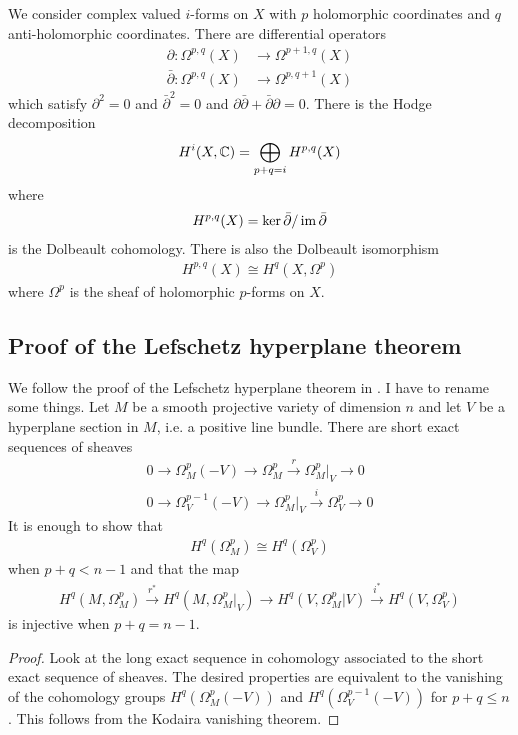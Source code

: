 \documentclass[12pt]{article}
\begin{document}
We consider complex valued $i$-forms on $X$ with $p$ holomorphic
coordinates and $q$
anti-holomorphic coordinates. There are differential operators
\begin{align*}
    \partial: \Omega^{p,q}(X)       & \to \Omega^{p+1,q}(X) \\
    \bar{\partial}: \Omega^{p,q}(X) & \to \Omega^{p,q+1}(X)
\end{align*} which satisfy $\partial^2 = 0$ and
$\bar{\partial}^2 = 0$ and $\partial\bar{\partial} + \bar{\partial}\partial = 0$.
There is the Hodge decomposition \begin{align*}
    H^i(X,\mathbb{C}) = \bigoplus_{p+q = i} H^{p,q}(X)
\end{align*} where
\begin{align*}
    H^{p,q}(X) = \ker \bar{\partial} / \operatorname{im} \bar{\partial}
\end{align*} is the Dolbeault cohomology. There is also the
Dolbeault isomorphism \begin{align*}
    H^{p,q}(X) \cong H^q(X,\Omega^p)
\end{align*} where $\Omega^p$ is the sheaf of holomorphic $p$-forms on $X$.

\subsection{Proof of the Lefschetz hyperplane theorem}
We follow the proof of the Lefschetz hyperplane theorem in \cite{griffiths-harris}.
I have to rename some things. Let $M$ be a smooth projective variety of dimension $n$ and let $V$ be a
hyperplane section in $M$, i.e. a positive line bundle. There are short exact sequences of sheaves \begin{align*}
    0 \to \Omega^p_M(-V) \to \Omega^p_M \xrightarrow{r} \Omega^p_M\vert_V \to 0 \\
    0 \to \Omega^{p-1}_V(-V) \to \Omega^p_M\vert_V \xrightarrow{i} \Omega^p_V \to 0
\end{align*}
It is enough to show that
\begin{align*}
    H^q(\Omega^p_M) \cong H^q(\Omega^p_V)
\end{align*} when $p+q < n-1$ and that the map \begin{align*}
    H^q(M,\Omega^p_M) \xrightarrow{r^*} H^q(M,\Omega^p_M\vert_V) \to H^q(V,\Omega^p_M\vert V) \xrightarrow{i^*} H^q(V,\Omega^p_V)
\end{align*} is injective when $p+q = n-1$.
\begin{proof}
    Look at the long exact sequence in cohomology associated to the short exact sequence of sheaves.
    The desired properties are equivalent to the vanishing of the cohomology groups $H^q(\Omega^p_M(-V))$ and
    $H^q(\Omega^{p-1}_V(-V))$ for $p+q \leq n$. This follows from the Kodaira vanishing theorem.
\end{proof}
\end{document}
